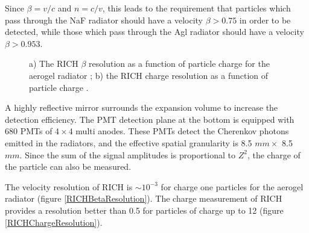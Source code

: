 Since $\beta=v/c$ and $n=c/v$, this leads to the requirement that particles which pass through the NaF radiator should have a velocity $\beta > 0.75$ in order to be detected, while those which pass through the Agl radiator should have a velocity $\beta > 0.953$.  \par

\begin{figure}[H] 
\centering   
{}    
\caption[The RICH $\beta$ and charge resolution.]{a) The RICH $\beta$ resolution as a function of particle charge for the aerogel radiator \cite{RichResolution}; b) the RICH charge resolution as a function of particle charge \cite{RichResolution}.}
\end{figure}

A highly reflective mirror surrounds the expansion volume to increase the detection efficiency. The PMT detection plane at the bottom is equipped with 680 PMTs of $4 \times 4$ multi anodes. These PMTs detect the Cherenkov photons emitted in the radiators, and the effective spatial granularity is 8.5 $mm \times$ 8.5 $mm$. Since the sum of the signal amplitudes is proportional to $Z^2$, the charge of the particle can also be measured.   \par
      

The velocity resolution of RICH is $\sim 10^{-3}$ for charge one particles for the aerogel radiator (figure \ref{RICHBetaResolution}). The charge measurement of RICH provides a resolution better than 0.5 for particles of charge up to 12 (figure \ref{RICHChargeResolution}).




